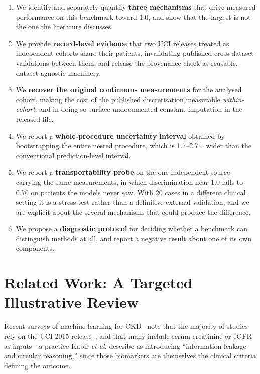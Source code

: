 \documentclass[conference]{IEEEtran}
\begin{document}
\begin{enumerate}
  \item We identify and separately quantify \textbf{three mechanisms} that
        drive measured performance on this benchmark toward 1.0, and show that
        the largest is not the one the literature discusses.
  \item We provide \textbf{record-level evidence} that two UCI releases treated
        as independent cohorts share their patients, invalidating published
        cross-dataset validations between them, and release the provenance
        check as reusable, dataset-agnostic machinery.
  \item We \textbf{recover the original continuous measurements} for the
        analysed cohort, making the cost of the published discretisation
        measurable \emph{within-cohort}, and in doing so surface undocumented
        constant imputation in the released file.
  \item We report a \textbf{whole-procedure uncertainty interval} obtained by
        bootstrapping the entire nested procedure, which is 1.7--2.7$\times$
        wider than the conventional prediction-level interval.
  \item We report a \textbf{transportability probe} on the one independent
        source carrying the same measurements, in which discrimination near
        1.0 falls to 0.70 on patients the models never saw. With 20 cases in
        a different clinical setting it is a stress test rather than a
        definitive external validation, and we are explicit about the several
        mechanisms that could produce the difference.
  \item We propose a \textbf{diagnostic protocol} for deciding whether a
        benchmark can distinguish methods at all, and report a negative
        result about one of its own components.
\end{enumerate}

\section{Related Work: A Targeted Illustrative Review}
\label{sec:priorwork}

Recent surveys of machine learning for CKD~\cite{kabir2026} note that the
majority of studies rely on the UCI-2015 release~\cite{uci2015}, and that many
include serum creatinine or eGFR as inputs---a practice Kabir \emph{et al.}
describe as introducing ``information leakage and circular reasoning,'' since
those biomarkers are themselves the clinical criteria defining the outcome.
\end{document}
